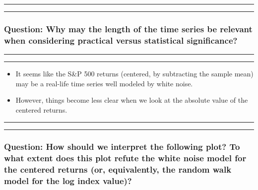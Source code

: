 \documentclass[]{article}
\begin{document}
\begin{center}\rule{0.5\linewidth}{\linethickness}\end{center}

\begin{center}\rule{0.5\linewidth}{\linethickness}\end{center}

\subsubsection{Question: Why may the length of the time series be
relevant when considering practical versus statistical
significance?}\label{question-why-may-the-length-of-the-time-series-be-relevant-when-considering-practical-versus-statistical-significance}

\begin{center}\rule{0.5\linewidth}{\linethickness}\end{center}

\begin{center}\rule{0.5\linewidth}{\linethickness}\end{center}

\begin{itemize}
\item
  It seems like the S\&P 500 returns (centered, by subtracting the
  sample mean) may be a real-life time series well modeled by white
  noise.
\item
  However, things become less clear when we look at the absolute value
  of the centered returns.
\end{itemize}

\begin{center}\rule{0.5\linewidth}{\linethickness}\end{center}

\begin{center}\rule{0.5\linewidth}{\linethickness}\end{center}

\subsubsection{Question: How should we interpret the following plot? To
what extent does this plot refute the white noise model for the centered
returns (or, equivalently, the random walk model for the log index
value)?}\label{question-how-should-we-interpret-the-following-plot-to-what-extent-does-this-plot-refute-the-white-noise-model-for-the-centered-returns-or-equivalently-the-random-walk-model-for-the-log-index-value}
\end{document}
